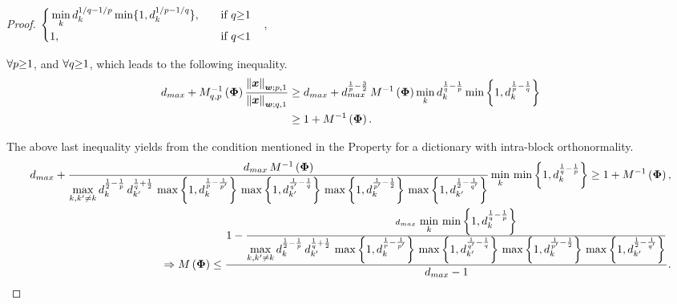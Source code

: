 \begin{proof}
$\begin{cases}
\begin{aligned}
&\min_k d_k^{1/q {-} 1/p} \min \{1 , d_k^{1/p {-} 1/q} \}, \quad &&\text{if }q {\geq} 1 \\
&1, \quad &&\text{if }q {<} 1
\end{aligned}
\end{cases}
$, 

$\forall p {\geq} 1$, and $\forall q {\geq} 1$, which leads to the following inequality.
\begin{gather*}
\begin{aligned}
d_{max} + M_{q,p}^{-1}\myparanthese{\myPhi} \frac{\mynorm{\boldsymbol{x}}_{\boldsymbol{w};p,1}}{\mynorm{\boldsymbol{x}}_{\boldsymbol{w};q,1}} &\geq 
d_{max} + d_{max}^{\frac1p - \frac32} \, M^{-1}\myparanthese{\myPhi} \displaystyle\min_k d_k^{\frac1q - \frac1p} \min \mybrace{1 , d_k^{\frac1p - \frac1q}} \\ %
&\geq 1 + M^{-1}\myparanthese{\myPhi}.
\end{aligned}
\end{gather*}

The above last inequality yields from the condition mentioned in the Property for a dictionary with intra-block orthonormality.
\fi
{} 
\begin{gather*}
\begin{aligned}
d_{max} + \frac{d_{max} \, M^{-1}\left( \boldsymbol{\Phi} \right)}{\displaystyle\max_{k,k' \neq k} d_{k}^{\frac12 - \frac1p} \, d_{k'}^{\frac1q + \frac12} \, \max \left\lbrace 1 , d_k^{\frac1p - \frac{1}{p'}} \right\rbrace \, \max \left\lbrace 1 , d_{k'}^{\frac{1}{q'} - \frac1q} \right\rbrace \, \max \left\lbrace 1 , d_k^{\frac{1}{p'} -\frac12} \right\rbrace \, \max \left\lbrace 1 , d_{k'}^{\frac{1}{2} - \frac{1}{q'}} \right\rbrace} \displaystyle\min_{k} \, \min \left\lbrace 1 , d_k^{\frac1q - \frac1p} \right\rbrace 
\geq 1 + M^{-1}\left( \boldsymbol{\Phi} \right), \\
\Rightarrow 
M\left( \boldsymbol{\Phi} \right) \leq
\frac{1 - \frac{d_{max} \, \displaystyle\min_{k} \, \min \left\lbrace 1 , d_k^{\frac1q - \frac1p} \right\rbrace}{\displaystyle\max_{k,k' \neq k} d_{k}^{\frac12 - \frac1p} \, d_{k'}^{\frac1q + \frac12} \, \max \left\lbrace 1 , d_k^{\frac1p - \frac{1}{p'}} \right\rbrace \, \max \left\lbrace 1 , d_{k'}^{\frac{1}{q'} - \frac1q} \right\rbrace \, \max \left\lbrace 1 , d_k^{\frac{1}{p'} -\frac12} \right\rbrace \, \max \left\lbrace 1 , d_{k'}^{\frac{1}{2} - \frac{1}{q'}} \right\rbrace}}{d_{max} - 1}.
\end{aligned}
\end{gather*}
\end{proof}